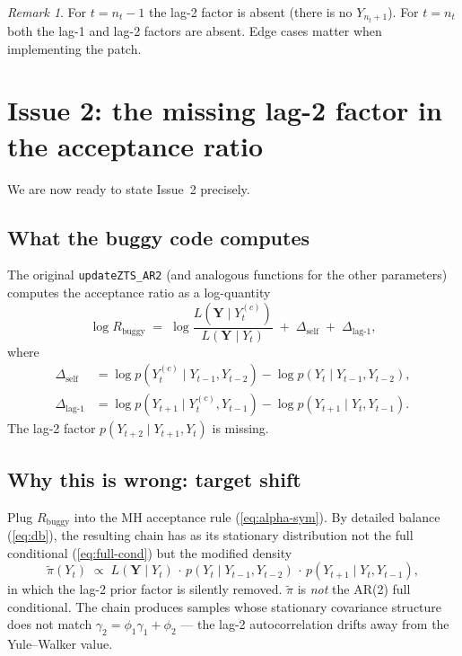\documentclass[11pt]{article}
\newcommand{\bY}{\mathbf{Y}}
\newcommand{\eref}[1]{(\ref{#1})}
\theoremstyle{plain}
\theoremstyle{definition}
\theoremstyle{remark}
\newtheorem{remark}[proposition]{Remark}
\begin{document}
\begin{remark}
For $t = n_t - 1$ the lag-2 factor is absent (there is no $Y_{n_t+1}$).
For $t = n_t$ both the lag-1 and lag-2 factors are absent. Edge cases
matter when implementing the patch.
\end{remark}

\section{Issue 2: the missing lag-2 factor in the acceptance ratio}\label{sec:issue2}

We are now ready to state Issue~2 precisely.

\subsection{What the buggy code computes}\label{sec:buggy-R}

The original \texttt{updateZTS\_AR2} (and analogous functions for the
other parameters) computes the acceptance ratio as a log-quantity
\[
  \log R_{\mathrm{buggy}}
  \;=\; \log\frac{L(\bY \mid Y_t^{(c)})}{L(\bY \mid Y_t)}
        \;+\;\Delta_{\text{self}}
        \;+\;\Delta_{\text{lag-1}},
\]
where
\begin{align*}
  \Delta_{\text{self}}  &= \log p(Y_t^{(c)} \mid Y_{t-1}, Y_{t-2})
                          - \log p(Y_t \mid Y_{t-1}, Y_{t-2}), \\
  \Delta_{\text{lag-1}} &= \log p(Y_{t+1} \mid Y_t^{(c)}, Y_{t-1})
                          - \log p(Y_{t+1} \mid Y_t,     Y_{t-1}).
\end{align*}
The lag-2 factor $p(Y_{t+2} \mid Y_{t+1}, Y_t)$ is missing.

\subsection{Why this is wrong: target shift}\label{sec:target-shift}

Plug $R_{\mathrm{buggy}}$ into the MH acceptance rule \eref{eq:alpha-sym}.
By detailed balance \eref{eq:db}, the resulting chain has as its
stationary distribution not the full conditional \eref{eq:full-cond} but
the modified density
\begin{equation}\label{eq:wrong-target}
  \widetilde\pi(Y_t)
  \;\propto\;
  L(\bY \mid Y_t)\,\cdot\,
  p(Y_t \mid Y_{t-1}, Y_{t-2})\,\cdot\,
  p(Y_{t+1} \mid Y_t, Y_{t-1}),
\end{equation}
in which the lag-2 prior factor is silently removed. $\widetilde\pi$ is
\emph{not} the AR(2) full conditional. The chain produces samples whose
stationary covariance structure does not match $\gamma_2 = \phi_1 \gamma_1
+ \phi_2$ --- the lag-2 autocorrelation drifts away from the Yule--Walker
value.
\end{document}
